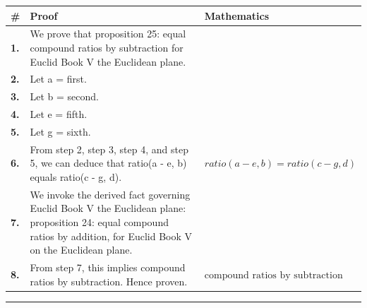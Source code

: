 \documentclass[11pt]{article}
\theoremstyle{definition}
\begin{document}
\begin{tabular}{@{} >{\raggedright\arraybackslash}p{} >{\raggedright\arraybackslash}p{} >{\raggedleft\arraybackslash}p{} @{}}
\textbf{\#} & \textbf{Proof} & \textbf{Mathematics} \\
\midrule
\textbf{1.} & We prove that proposition 25: equal compound ratios by subtraction for Euclid Book V the Euclidean plane. & \\[0.45em]
\textbf{2.} & Let a = first. & \\[0.45em]
\textbf{3.} & Let b = second. & \\[0.45em]
\textbf{4.} & Let e = fifth. & \\[0.45em]
\textbf{5.} & Let g = sixth. & \\[0.45em]
\textbf{6.} & From step 2, step 3, step 4, and step 5, we can deduce that ratio(a - e, b) equals ratio(c - g, d). & $\displaystyle ratio(a - e, b) = ratio(c - g, d)$ \\[0.45em]
\textbf{7.} & We invoke the derived fact governing Euclid Book V the Euclidean plane: proposition 24: equal compound ratios by addition, for Euclid Book V on the Euclidean plane. & \\[0.45em]
\textbf{8.} & From step 7, this implies compound ratios by subtraction. Hence proven. & $\displaystyle \text{compound ratios by subtraction}$ \\[0.45em]
\bottomrule
\end{tabular}
\label{thm:Geometry-Euclid Book V-proposition_25_equal_compound_ratios_by_subtraction}
\par\medskip\hrule
\end{document}
